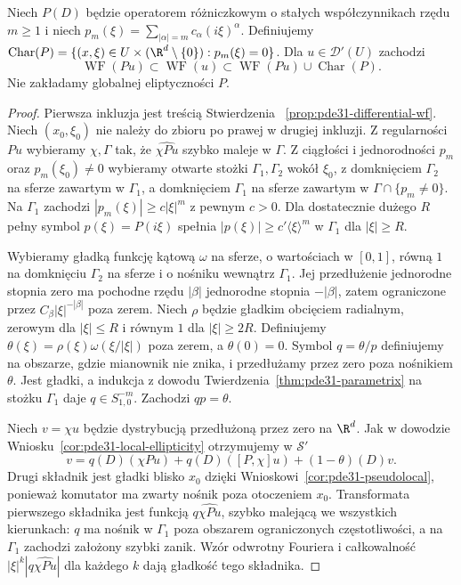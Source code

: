 \begin{twierdzenie}
\label{thm:pde31-conic-ellipticity}
Niech $P(D)$ będzie operatorem różniczkowym o stałych
współczynnikach rzędu $m\ge1$ i niech
$p_m(\xi)=\sum_{|\alpha|=m}c_\alpha(i\xi)^\alpha$.
Definiujemy
$\operatorname{Char}(P)=\{(x,\xi)\in U\times
(\R^d\setminus\{0\}):p_m(\xi)=0\}$.
Dla $u\in\mathcal D'(U)$ zachodzi
\[
 \operatorname{WF}(Pu)\subset\operatorname{WF}(u)
 \subset\operatorname{WF}(Pu)\cup\operatorname{Char}(P).
\]
Nie zakładamy globalnej eliptyczności $P$.
\end{twierdzenie}
\begin{proof}
Pierwsza inkluzja jest treścią Stwierdzenia
~\ref{prop:pde31-differential-wf}.
Niech $(x_0,\xi_0)$ nie należy do zbioru po prawej
w drugiej inkluzji. Z regularności $Pu$ wybieramy
$\chi,\Gamma$ tak, że $\widehat{\chi Pu}$
szybko maleje w $\Gamma$.
Z ciągłości i jednorodności $p_m$ oraz
$p_m(\xi_0)\ne0$ wybieramy otwarte stożki
$\Gamma_1,\Gamma_2$ wokół $\xi_0$,
z domknięciem $\Gamma_2$ na sferze zawartym
w $\Gamma_1$, a domknięciem $\Gamma_1$ na sferze
zawartym w $\Gamma\cap\{p_m\ne0\}$.
Na $\Gamma_1$ zachodzi
$|p_m(\xi)|\ge c|\xi|^m$ z pewnym $c>0$.
Dla dostatecznie dużego $R$ pełny symbol
$p(\xi)=P(i\xi)$ spełnia
$|p(\xi)|\ge c' \langle\xi\rangle^m$
w $\Gamma_1$ dla $|\xi|\ge R$.

Wybieramy gładką funkcję kątową $\omega$ na
sferze, o wartościach w $[0,1]$, równą $1$
na domknięciu $\Gamma_2$ na sferze i o nośniku
wewnątrz $\Gamma_1$. Jej przedłużenie jednorodne
stopnia zero ma pochodne rzędu $|\beta|$
jednorodne stopnia $-|\beta|$, zatem ograniczone
przez $C_\beta|\xi|^{-|\beta|}$ poza zerem.
Niech $\rho$ będzie gładkim obcięciem radialnym,
zerowym dla $|\xi|\le R$ i równym $1$ dla
$|\xi|\ge2R$. Definiujemy $\theta(\xi)=
\rho(\xi)\omega(\xi/|\xi|)$ poza zerem,
a $\theta(0)=0$.
Symbol $q=\theta/p$ definiujemy na obszarze,
gdzie mianownik nie znika, i przedłużamy przez zero
poza nośnikiem $\theta$. Jest gładki, a indukcja
z dowodu Twierdzenia~\ref{thm:pde31-parametrix}
na stożku $\Gamma_1$ daje $q\in S^{-m}_{1,0}$.
Zachodzi $qp=\theta$.

Niech $v=\chi u$ będzie dystrybucją
przedłużoną przez zero na $\R^d$.
Jak w dowodzie Wniosku~\ref{cor:pde31-local-ellipticity}
otrzymujemy w $\mathcal S'$
\[
 v=q(D)(\chi Pu)+q(D)([P,\chi]u)+(1-\theta)(D)v .
\]
Drugi składnik jest gładki blisko $x_0$ dzięki
Wnioskowi~\ref{cor:pde31-pseudolocal}, ponieważ
komutator ma zwarty nośnik poza otoczeniem $x_0$.
Transformata pierwszego składnika jest funkcją
$q\widehat{\chi Pu}$, szybko malejącą we wszystkich
kierunkach: $q$ ma nośnik w $\Gamma_1$ poza
obszarem ograniczonych częstotliwości,
a na $\Gamma_1$ zachodzi założony szybki zanik.
Wzór odwrotny Fouriera i całkowalność
$|\xi|^k|q\widehat{\chi Pu}|$ dla każdego $k$
dają gładkość tego składnika.


\end{proof}

